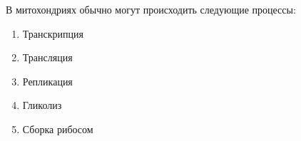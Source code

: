 
В митохондриях обычно могут происходить
следующие процессы:

\begin{enumerate}
    \item Транскрипция
    \item Трансляция
    \item Репликация
    \item Гликолиз
    \item Сборка рибосом
\end{enumerate}



